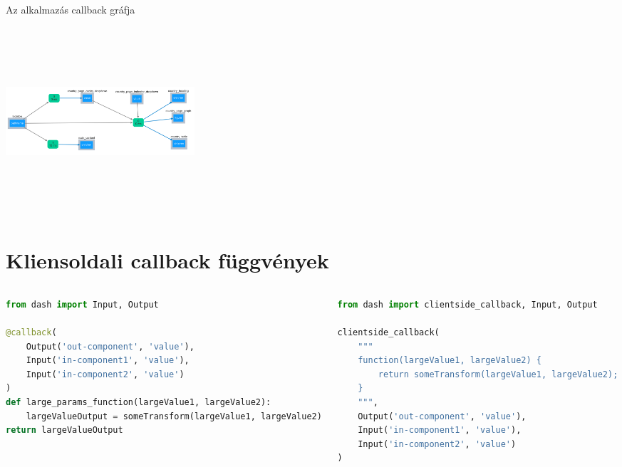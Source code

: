 \documentclass[english, aspectratio=169]{beamer}
\makeatletter
\let\origtableofcontents=\tableofcontents
\def\tableofcontents{\@ifnextchar[{\origtableofcontents}{\gobbletableofcontents}}
\def\gobbletableofcontents#1{\origtableofcontents}
\makeatother
\begin{document}
\begin{frame}[fragile]{Az alkalmazás callback gráfja}
	\begin{center}
		\includegraphics[width=7cm, height=7cm, keepaspectratio]{images/adv_8.png}
	\end{center}
\end{frame}

\section{Kliensoldali callback függvények}

\begin{frame}{}
	\tableofcontents[currentsection]
\end{frame}

\begin{frame}[fragile]{}
	\begin{columns}
		\begin{column}{.5\textwidth}
			\begin{lstlisting}[language=python]
from dash import Input, Output

@callback(
	Output('out-component', 'value'),
	Input('in-component1', 'value'),
	Input('in-component2', 'value')
)
def large_params_function(largeValue1, largeValue2):
	largeValueOutput = someTransform(largeValue1, largeValue2)
return largeValueOutput	
			\end{lstlisting}
		\end{column}
		\begin{column}{.5\textwidth}
			\begin{lstlisting}[language=python]
from dash import clientside_callback, Input, Output

clientside_callback(
	"""
	function(largeValue1, largeValue2) {
		return someTransform(largeValue1, largeValue2);
	}
	""",
	Output('out-component', 'value'),
	Input('in-component1', 'value'),
	Input('in-component2', 'value')
)
			\end{lstlisting}
		\end{column}
	\end{columns}
\end{frame}
\end{document}
